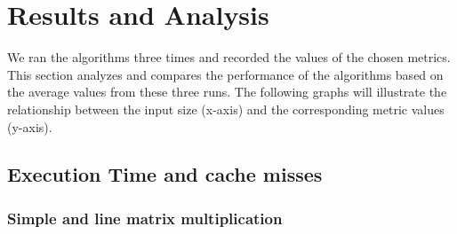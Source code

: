 \section{Results and Analysis}
We ran the algorithms three times 
and recorded the values of the chosen 
metrics. This section analyzes and 
compares the performance of the
algorithms based on the average 
values from these three runs. The 
following graphs will illustrate the 
relationship between the input size 
(x-axis) and the corresponding metric 
values (y-axis).

\subsection{Execution Time and cache misses}
\subsubsection{Simple and line matrix multiplication}

